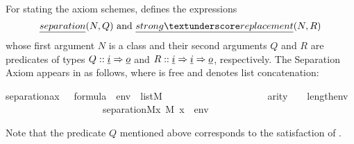 For stating the axiom schemes,  defines
the expressions
\[
  \isa{separation}(N,Q)
  \text{ and }
  \isa{strong{\uscore}replacement}(N,R)
\]
whose first argument $N$ is a class and their second arguments $Q$ and
$R$ are predicates of types $Q :: \tyi \fun \tyo$ and $R ::
\tyi \fun \tyi \fun \tyo$, respectively. The Separation Axiom appears in
 as follows, where 
\isa{\isasymphi} is free and \isa{\isacharat} denotes
list concatenation:
\begin{isabelle}
separation{\isacharunderscore}{\kern0pt}ax{\isacharcolon}{\kern0pt}\ {\isachardoublequoteopen}{\isasymphi}\ {\isasymin}\ formula\ {\isasymLongrightarrow}\ env\ {\isasymin}\ list{\isacharparenleft}{\kern0pt}M{\isacharparenright}{\kern0pt}\ {\isasymLongrightarrow}\isanewline
\ \ \ \ \ \ \ \ \ \ \ \ \ \ \ \ \ \ \ \ arity{\isacharparenleft}{\kern0pt}{\isasymphi}{\isacharparenright}{\kern0pt}\ {\isasymle}\ {}\ {\isacharplus}{\kern0pt}\isactrlsub {\isasymomega}\ length{\isacharparenleft}{\kern0pt}env{\isacharparenright}{\kern0pt}\ {\isasymLongrightarrow}\isanewline
\ \ \ \ \ \ \ \ \ \ \ \ \ \ \ \ \ \ \ \ separation{\isacharparenleft}{\kern0pt}{\isacharhash}{\kern0pt}{\isacharhash}{\kern0pt}M{\isacharcomma}{\kern0pt}{\isasymlambda}x{\isachardot}{\kern0pt}\ {\isacharparenleft}{\kern0pt}M{\isacharcomma}{\kern0pt}\ {\isacharbrackleft}{\kern0pt}x{\isacharbrackright}{\kern0pt}\ {\isacharat}{\kern0pt}\ env\ {\isasymTurnstile}\ {\isasymphi}{\isacharparenright}{\kern0pt}{\isacharparenright}{\kern0pt}{\isachardoublequoteclose}
\end{isabelle}
Note that the predicate $Q$ mentioned above corresponds to the
satisfaction of \isa{\isasymphi}.

